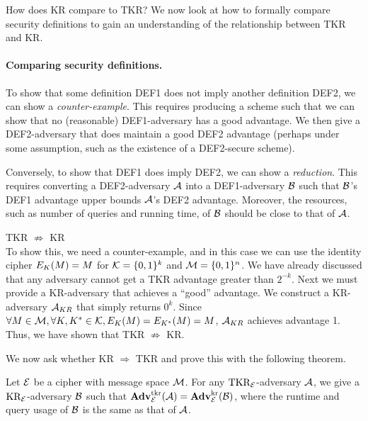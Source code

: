 How does KR compare to TKR? We now look at how to formally compare security definitions to gain an understanding of the relationship between TKR and KR. 

\paragraph{Comparing security definitions.} To show that some definition DEF1 does not imply another definition DEF2, we can show a \textit{counter-example}. This requires producing a scheme such that we can show that no (reasonable) DEF1-adversary has a good advantage. We then give a DEF2-adversary that does maintain a good DEF2 advantage (perhaps under some assumption, such as the existence of a DEF2-secure scheme). 

Conversely, to show that DEF1 does imply DEF2, we can show a \textit{reduction}. This requires converting a DEF2-adversary ${\mathcal A}$ into a DEF1-adversary ${\mathcal B}$ such that ${\mathcal B}$'s DEF1 advantage upper bounds ${\mathcal A}$'s DEF2 advantage. Moreover, the resources, such as number of queries and running time, of ${\mathcal B}$ should be close to that of ${\mathcal A}$.

\begin{example}
TKR $\not \Rightarrow$ KR \\
To show this, we need a counter-example, and in this case we can use the identity cipher $E_{K}(M) = M$ for ${\cal K}=\{0,1\}^k$ and ${\cal M}=\{0,1\}^n$. 
We have already discussed that any adversary cannot get a TKR advantage greater than $2^{-k}$. Next we must provide a KR-adversary that achieves a ``good'' advantage. We construct a KR-adversary ${\mathcal A}_{KR}$ that simply returns $0^k$. Since $\forall M\in{\cal M}, \forall K, K^* \in {\cal K}, E_{K}(M) = E_{K^*}(M) = M$, ${\mathcal A}_{KR}$ achieves advantage 1. Thus, we have shown that TKR $\not \Rightarrow$ KR. 
\end{example}

We now ask whether KR $\Rightarrow$ TKR and prove this with the following theorem. 

\begin{theorem}
	\label{thm-tkr-kr}
	Let ${\cal E}$ be a cipher with message space ${\cal M}$. For any $\textnormal{TKR}_{\cal E}$-adversary ${\mathcal A}$, we give a
	$\textnormal{KR}_{\cal E}$-adversary ${\mathcal B}$ such that 
	$\mathbf{Adv}^{\mathrm{tkr}}_{{\cal E}}({\mathcal A}) = \mathbf{Adv}^{\mathrm{kr}}_{{\cal E}}({\mathcal B})$, where the runtime and query usage of ${\mathcal B}$ is the same as that of ${\mathcal A}$. 
\end{theorem}

